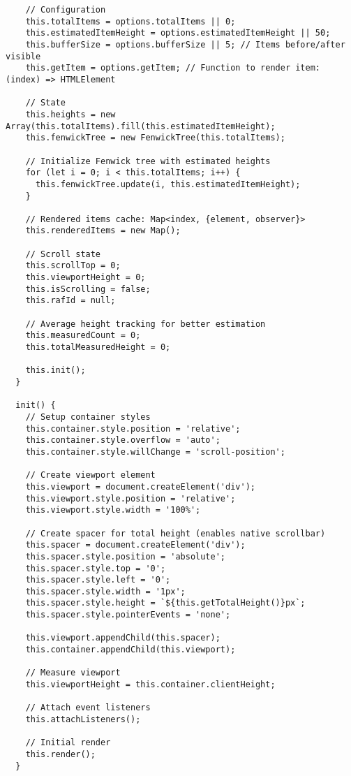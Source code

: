 \documentclass[11pt]{article}
\begin{document}
\begin{verbatim}
    // Configuration
    this.totalItems = options.totalItems || 0;
    this.estimatedItemHeight = options.estimatedItemHeight || 50;
    this.bufferSize = options.bufferSize || 5; // Items before/after visible
    this.getItem = options.getItem; // Function to render item: (index) => HTMLElement
    
    // State
    this.heights = new Array(this.totalItems).fill(this.estimatedItemHeight);
    this.fenwickTree = new FenwickTree(this.totalItems);
    
    // Initialize Fenwick tree with estimated heights
    for (let i = 0; i < this.totalItems; i++) {
      this.fenwickTree.update(i, this.estimatedItemHeight);
    }
    
    // Rendered items cache: Map<index, {element, observer}>
    this.renderedItems = new Map();
    
    // Scroll state
    this.scrollTop = 0;
    this.viewportHeight = 0;
    this.isScrolling = false;
    this.rafId = null;
    
    // Average height tracking for better estimation
    this.measuredCount = 0;
    this.totalMeasuredHeight = 0;
    
    this.init();
  }
  
  init() {
    // Setup container styles
    this.container.style.position = 'relative';
    this.container.style.overflow = 'auto';
    this.container.style.willChange = 'scroll-position';
    
    // Create viewport element
    this.viewport = document.createElement('div');
    this.viewport.style.position = 'relative';
    this.viewport.style.width = '100%';
    
    // Create spacer for total height (enables native scrollbar)
    this.spacer = document.createElement('div');
    this.spacer.style.position = 'absolute';
    this.spacer.style.top = '0';
    this.spacer.style.left = '0';
    this.spacer.style.width = '1px';
    this.spacer.style.height = `${this.getTotalHeight()}px`;
    this.spacer.style.pointerEvents = 'none';
    
    this.viewport.appendChild(this.spacer);
    this.container.appendChild(this.viewport);
    
    // Measure viewport
    this.viewportHeight = this.container.clientHeight;
    
    // Attach event listeners
    this.attachListeners();
    
    // Initial render
    this.render();
  }
  

\end{verbatim}
\end{document}
